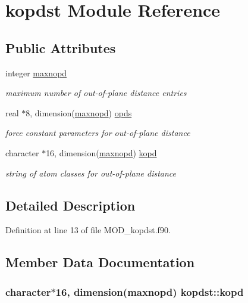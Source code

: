 \hypertarget{classkopdst}{\section{kopdst Module Reference}
\label{classkopdst}
}
\subsection*{Public Attributes}
\begin{DoxyCompactItemize}
\item 
integer \hyperlink{classkopdst_a2ce74a9ed60425c4792704097c5b2d23}{maxnopd}
\begin{DoxyCompactList}\small\item\em maximum number of out-\/of-\/plane distance entries \end{DoxyCompactList}\item 
real $\ast$8, dimension(\hyperlink{classkopdst_a2ce74a9ed60425c4792704097c5b2d23}{maxnopd}) \hyperlink{classkopdst_a83b00cc655f480bf2d21024fef8e92fc}{opds}
\begin{DoxyCompactList}\small\item\em force constant parameters for out-\/of-\/plane distance \end{DoxyCompactList}\item 
character $\ast$16, dimension(\hyperlink{classkopdst_a2ce74a9ed60425c4792704097c5b2d23}{maxnopd}) \hyperlink{classkopdst_aa99d92e2524ee060bf6bb4143ed37f12}{kopd}
\begin{DoxyCompactList}\small\item\em string of atom classes for out-\/of-\/plane distance \end{DoxyCompactList}\end{DoxyCompactItemize}


\subsection{Detailed Description}


Definition at line 13 of file M\-O\-D\-\_\-kopdst.\-f90.



\subsection{Member Data Documentation}
\hypertarget{classkopdst_aa99d92e2524ee060bf6bb4143ed37f12}{
\subsubsection[{kopd}]{\setlength{\rightskip}{0pt plus 5cm}character$\ast$16, dimension({\bf maxnopd}) kopdst\-::kopd}}\label{classkopdst_aa99d92e2524ee060bf6bb4143ed37f12}


